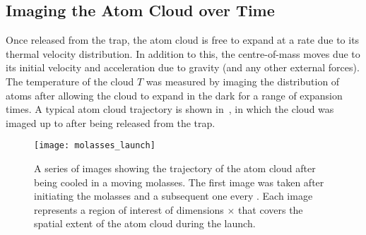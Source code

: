\subsection{Imaging the Atom Cloud over Time}\label{subsec:molasses_imaging}
Once released from the trap, the atom cloud is free to expand at a
rate due to its
thermal velocity distribution. In addition to this, the centre-of-mass
moves due to its initial velocity and acceleration due to gravity
(and any other external forces).
The temperature of the cloud $T$ was measured by imaging the
distribution of atoms after allowing the cloud to expand in the dark
for a range of expansion times. A typical atom cloud trajectory is
shown in~, in which the cloud was imaged
up to  after being released from the trap.

\begin{figure}[!htbp]
  \centering
  \texttt{[image: molasses\_launch]}
  \caption[Atom cloud position after launching in a moving molasses]{A
  series of images showing the trajectory of the atom cloud after
being cooled in a moving molasses. The first image was taken
 after initiating the molasses and a
subsequent one every . Each image represents
a region of interest of dimensions  \(\times\)
 that covers the spatial extent of the atom cloud during the launch.}
 \label{fig:molasses_launch}
\end{figure}
